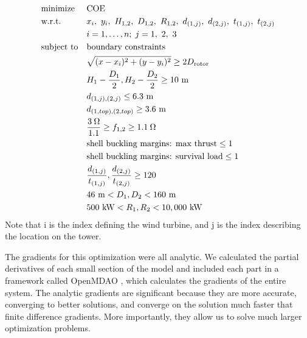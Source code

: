         \begin{equation}
			\begin{aligned}
				& \text{minimize}
					& & \text{COE} \\
                & \text{w.r.t.} 
                	&& x_i,~ y_i,~ H_{1,2},~ D_{1,2},~ R_{1,2},~ d_{(1,j)},~ d_{(2,j)},~ t_{(1,j)},~t_{(2,j)}\\
                		&&& i = 1, \ldots, n; \; j = 1,~2,~3 \\
				& \text{subject to}
					& & \text{boundary constraints} \\
						&&& \sqrt{(x-x_i)^2+(y-y_i)^2} \geq 2D_{\text{rotor}} \\
						&&& H_1-\frac{D_1}{2}, H_2-\frac{D_2}{2} \geq 10~ \text{m}\\
                		&&& d_{(1,j),(2,j)} \leq 6.3~ \text{m}\\
                		&&& d_{(1,top),(2,top)} \geq 3.6~ \text{m}\\
						&&& \frac{3\hspace{0.08cm}\Omega}{1.1} \geq f_{1,2} \geq 1.1\hspace{0.08cm}\Omega \\
                		&&& \text{shell buckling margins: max thrust} \leq 1 \\
                        &&& \text{shell buckling margins: survival load} \leq 1 \\
                		&&& \frac{d_{(1,j)}}{t_{(1,j)}},\frac{d_{(2,j)}}{t_{(2,j)}} \geq 120\\
                        &&& 46~ \text{m} < D_1,D_2 < 160~ \text{m}  \\
                        &&& 500~ \text{kW} < R_1,R_2 < 10,000~ \text{kW} \\
			\end{aligned}
		\end{equation}
%
Note that i is the index defining the wind turbine, and j is the index describing the location on the tower.
        
        The gradients for this optimization were all analytic. We calculated the partial derivatives of each small section of the model and included each part in a framework called OpenMDAO \cite{gray2010openmdao}, which calculates the gradients of the entire system. The analytic gradients are significant because they are more accurate, converging to better solutions, and converge on the solution much faster that finite difference gradients. More importantly, they allow us to solve much larger optimization problems. %
        
